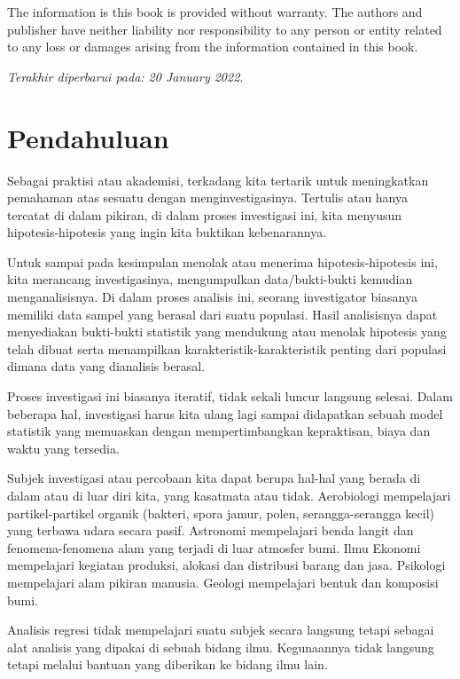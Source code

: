 \documentclass[
]{book}
\begin{document}
The information is this book is provided without warranty. The authors and publisher have neither liability nor responsibility to any person or entity related to any loss or damages arising from the information contained in this book.

\emph{Terakhir diperbarui pada: 20 January 2022}.

\hypertarget{pendahuluan}{%
\chapter{Pendahuluan}\label{pendahuluan}}

Sebagai praktisi atau akademisi, terkadang kita tertarik untuk
meningkatkan pemahaman atas sesuatu dengan menginvestigasinya. Tertulis
atau hanya tercatat di dalam pikiran, di dalam proses investigasi ini,
kita menyusun hipotesis-hipotesis yang ingin kita buktikan kebenarannya.

Untuk sampai pada kesimpulan menolak atau menerima hipotesis-hipotesis
ini, kita merancang investigasinya, mengumpulkan data/bukti-bukti
kemudian menganalisisnya. Di dalam proses analisis ini, seorang investigator biasanya memiliki data sampel yang berasal dari suatu populasi. Hasil analisisnya dapat menyediakan bukti-bukti statistik yang mendukung atau menolak hipotesis yang telah dibuat serta menampilkan karakteristik-karakteristik penting dari populasi dimana data yang dianalisis berasal.

Proses investigasi ini biasanya iteratif, tidak sekali luncur langsung
selesai. Dalam beberapa hal, investigasi harus kita ulang lagi sampai
didapatkan sebuah model statistik yang memuaskan dengan mempertimbangkan
kepraktisan, biaya dan waktu yang tersedia.

Subjek investigasi atau percobaan kita dapat berupa hal-hal yang berada
di dalam atau di luar diri kita, yang kasatmata atau tidak. Aerobiologi
mempelajari partikel-partikel organik (bakteri, spora jamur, polen,
serangga-serangga kecil) yang terbawa udara secara pasif. Astronomi
mempelajari benda langit dan fenomena-fenomena alam yang terjadi di luar
atmosfer bumi. Ilmu Ekonomi mempelajari kegiatan produksi, alokasi dan
distribusi barang dan jasa. Psikologi mempelajari alam pikiran manusia.
Geologi mempelajari bentuk dan komposisi bumi.

Analisis regresi tidak mempelajari suatu subjek secara langsung tetapi
sebagai alat analisis yang dipakai di sebuah bidang ilmu. Kegunaannya
tidak langsung tetapi melalui bantuan yang diberikan ke bidang ilmu
lain.
\end{document}

